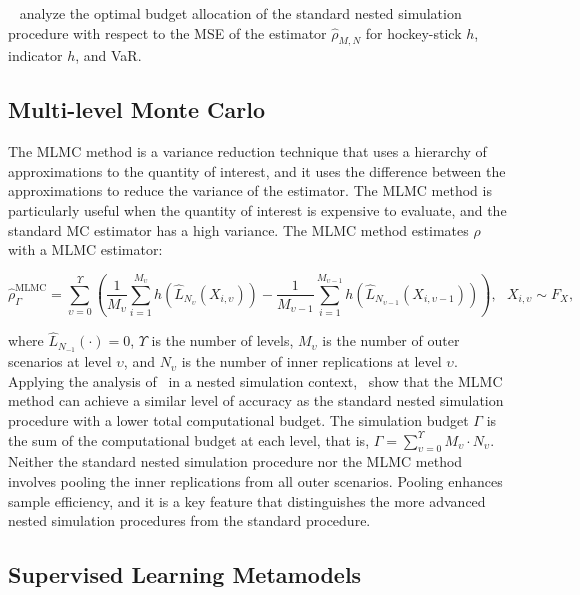 ~\cite{gordy2010nested} analyze the optimal budget allocation of the standard nested simulation procedure with respect to the MSE of the estimator $\hat{\rho}_{M, N}$ for hockey-stick $h$, indicator $h$, and VaR.

\subsection{Multi-level Monte Carlo}

The MLMC method is a variance reduction technique that uses a hierarchy of approximations to the quantity of interest, and it uses the difference between the approximations to reduce the variance of the estimator.
The MLMC method is particularly useful when the quantity of interest is expensive to evaluate, and the standard MC estimator has a high variance.
The MLMC method estimates $\rho$ with a MLMC estimator:

\begin{equation*}
    \hat{\rho}^{\text{MLMC}}_\Gamma = \sum_{\upsilon=0}^{\Upsilon} \left( \frac{1}{M_{\upsilon}} \sum_{i=1}^{M_{\upsilon}} h(\hat{L}_{N_{\upsilon}}(X_{i, \upsilon})) - \frac{1}{M_{\upsilon-1}} \sum_{i=1}^{M_{\upsilon-1}} h(\hat{L}_{N_{\upsilon-1}}(X_{i, \upsilon-1})) \right), ~~~ X_{i, \upsilon} \sim F_X,
\end{equation*}

where $\hat{L}_{N_{-1}}(\cdot) = 0$, $\Upsilon$ is the number of levels, $M_{\upsilon}$ is the number of outer scenarios at level $\upsilon$, and $N_{\upsilon}$ is the number of inner replications at level $\upsilon$.
Applying the analysis of~\cite{giles2015multilevel} in a nested simulation context,~\cite{giles2019multilevel} show that the MLMC method can achieve a similar level of accuracy as the standard nested simulation procedure with a lower total computational budget.
The simulation budget $\Gamma$ is the sum of the computational budget at each level, that is, $\Gamma = \sum_{\upsilon=0}^{\Upsilon} M_{\upsilon} \cdot N_{\upsilon}$.
Neither the standard nested simulation procedure nor the MLMC method involves pooling the inner replications from all outer scenarios.
Pooling enhances sample efficiency, and it is a key feature that distinguishes the more advanced nested simulation procedures from the standard procedure.

\subsection{Supervised Learning Metamodels}

